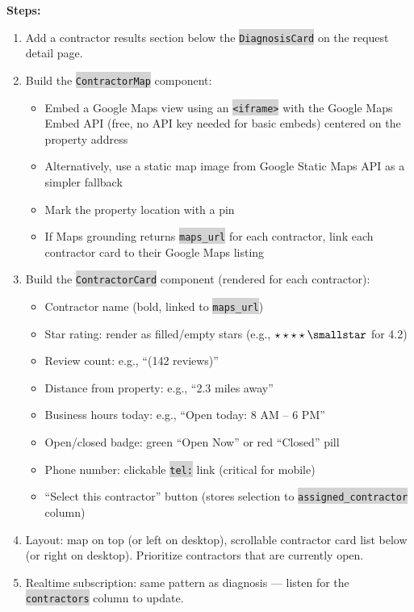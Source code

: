 \documentclass[11pt, a4paper]{article}
\newcommand{\code}[1]{\texttt{\small\colorbox{lightgray}{#1}}}
\begin{document}
\textbf{Steps:}
\begin{enumerate}[leftmargin=2em, itemsep=2pt]
  \item Add a contractor results section below the \code{DiagnosisCard} on the request detail page.
  \item Build the \code{ContractorMap} component:
    \begin{itemize}[itemsep=1pt]
      \item Embed a Google Maps view using an \code{<iframe>} with the Google Maps Embed API (free, no API key needed for basic embeds) centered on the property address
      \item Alternatively, use a static map image from Google Static Maps API as a simpler fallback
      \item Mark the property location with a pin
      \item If Maps grounding returns \code{maps\_url} for each contractor, link each contractor card to their Google Maps listing
    \end{itemize}
  \item Build the \code{ContractorCard} component (rendered for each contractor):
    \begin{itemize}[itemsep=1pt]
      \item Contractor name (bold, linked to \code{maps\_url})
      \item Star rating: render as filled/empty stars (e.g., $\star\star\star\star\smallstar$ for 4.2)
      \item Review count: e.g., ``(142 reviews)''
      \item Distance from property: e.g., ``2.3 miles away''
      \item Business hours today: e.g., ``Open today: 8 AM -- 6 PM''
      \item Open/closed badge: green ``Open Now'' or red ``Closed'' pill
      \item Phone number: clickable \code{tel:} link (critical for mobile)
      \item ``Select this contractor'' button (stores selection to \code{assigned\_contractor} column)
    \end{itemize}
  \item Layout: map on top (or left on desktop), scrollable contractor card list below (or right on desktop). Prioritize contractors that are currently open.
  \item Realtime subscription: same pattern as diagnosis --- listen for the \code{contractors} column to update.
\end{enumerate}
\end{document}
